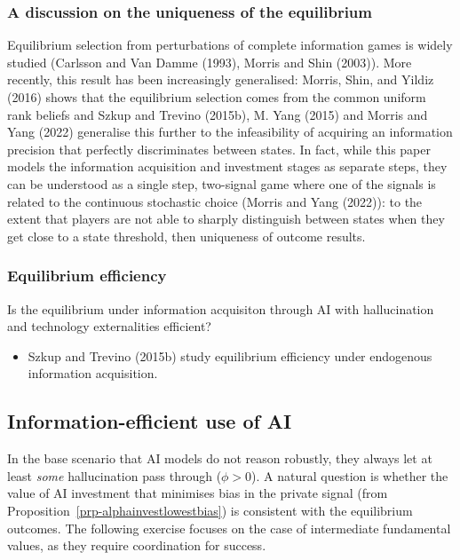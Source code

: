 \documentclass[
]{article}
\providecommand{\tightlist}{%
  \setlength{\itemsep}{0pt}\setlength{\parskip}{0pt}}\usepackage{longtable,booktabs,array}
\theoremstyle{plain}
\theoremstyle{definition}
\theoremstyle{remark}
\begin{document}
\subsubsection{A discussion on the uniqueness of the
equilibrium}\label{a-discussion-on-the-uniqueness-of-the-equilibrium}

Equilibrium selection from perturbations of complete information games
is widely studied (Carlsson and Van Damme (1993), Morris and Shin
(2003)). More recently, this result has been increasingly generalised:
Morris, Shin, and Yildiz (2016) shows that the equilibrium selection
comes from the common uniform rank beliefs and Szkup and Trevino
(2015b), M. Yang (2015) and Morris and Yang (2022) generalise this
further to the infeasibility of acquiring an information precision that
perfectly discriminates between states. In fact, while this paper models
the information acquisition and investment stages as separate steps,
they can be understood as a single step, two-signal game where one of
the signals is related to the continuous stochastic choice (Morris and
Yang (2022)): to the extent that players are not able to sharply
distinguish between states when they get close to a state threshold,
then uniqueness of outcome results.

\subsubsection{Equilibrium efficiency}\label{equilibrium-efficiency}

Is the equilibrium under information acquisiton through AI with
hallucination and technology externalities efficient?

\begin{itemize}
\tightlist
\item
  Szkup and Trevino (2015b) study equilibrium efficiency under
  endogenous information acquisition.
\end{itemize}

\subsection{Information-efficient use of
AI}\label{information-efficient-use-of-ai}

In the base scenario that AI models do not reason robustly, they always
let at least \emph{some} hallucination pass through (\(\phi > 0\)). A
natural question is whether the value of AI investment that minimises
bias in the private signal (from
Proposition~\ref{prp-alphainvestlowestbias}) is consistent with the
equilibrium outcomes. The following exercise focuses on the case of
intermediate fundamental values, as they require coordination for
success.
\end{document}
